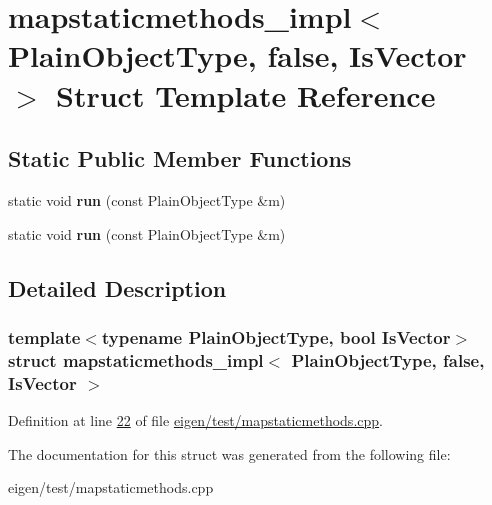 \hypertarget{structmapstaticmethods__impl_3_01_plain_object_type_00_01false_00_01_is_vector_01_4}{}\section{mapstaticmethods\+\_\+impl$<$ Plain\+Object\+Type, false, Is\+Vector $>$ Struct Template Reference}
\label{structmapstaticmethods__impl_3_01_plain_object_type_00_01false_00_01_is_vector_01_4}
\subsection*{Static Public Member Functions}
\begin{DoxyCompactItemize}
\item 
\mbox{\label{structmapstaticmethods__impl_3_01_plain_object_type_00_01false_00_01_is_vector_01_4_a260f91e1e608306425c494253791ba94}} 
static void {\bfseries run} (const Plain\+Object\+Type \&m)
\item 
\mbox{\label{structmapstaticmethods__impl_3_01_plain_object_type_00_01false_00_01_is_vector_01_4_a260f91e1e608306425c494253791ba94}} 
static void {\bfseries run} (const Plain\+Object\+Type \&m)
\end{DoxyCompactItemize}


\subsection{Detailed Description}
\subsubsection*{template$<$typename Plain\+Object\+Type, bool Is\+Vector$>$\newline
struct mapstaticmethods\+\_\+impl$<$ Plain\+Object\+Type, false, Is\+Vector $>$}



Definition at line \hyperlink{eigen_2test_2mapstaticmethods_8cpp_source_l00022}{22} of file \hyperlink{eigen_2test_2mapstaticmethods_8cpp_source}{eigen/test/mapstaticmethods.\+cpp}.



The documentation for this struct was generated from the following file\+:\begin{DoxyCompactItemize}
\item 
eigen/test/mapstaticmethods.\+cpp\end{DoxyCompactItemize}
